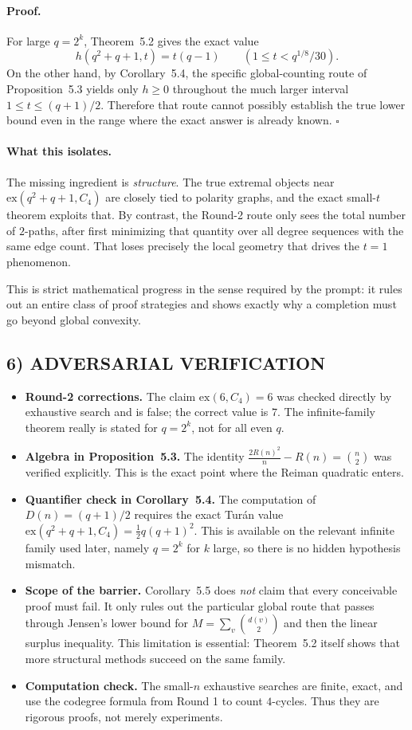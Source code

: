 \paragraph{Proof.}
For large $q=2^k$, Theorem~5.2 gives the exact value
\[
h(q^2+q+1,t)=t(q-1)
\qquad (1\le t<q^{1/8}/30).
\]
On the other hand, by Corollary~5.4, the specific global-counting route of Proposition~5.3 yields only $h\ge 0$ throughout the much larger interval $1\le t\le (q+1)/2$.
Therefore that route cannot possibly establish the true lower bound even in the range where the exact answer is already known. \hfill$\square$

\paragraph{What this isolates.}
The missing ingredient is \emph{structure}. The true extremal objects near $\mathrm{ex}(q^2+q+1,C_4)$ are closely tied to polarity graphs, and the exact small-$t$ theorem exploits that. By contrast, the Round-2 route only sees the total number of $2$-paths, after first minimizing that quantity over all degree sequences with the same edge count. That loses precisely the local geometry that drives the $t=1$ phenomenon.

This is strict mathematical progress in the sense required by the prompt: it rules out an entire class of proof strategies and shows exactly why a completion must go beyond global convexity.

\subsection*{6) ADVERSARIAL VERIFICATION}
\begin{itemize}
\item \textbf{Round-2 corrections.} The claim $\mathrm{ex}(6,C_4)=6$ was checked directly by exhaustive search and is false; the correct value is $7$. The infinite-family theorem really is stated for $q=2^k$, not for all even $q$.
\item \textbf{Algebra in Proposition~5.3.} The identity $\frac{2R(n)^2}{n}-R(n)=\binom n2$ was verified explicitly. This is the exact point where the Reiman quadratic enters.
\item \textbf{Quantifier check in Corollary~5.4.} The computation of $D(n)=(q+1)/2$ requires the exact Tur\'an value $\mathrm{ex}(q^2+q+1,C_4)=\tfrac12 q(q+1)^2$. This is available on the relevant infinite family used later, namely $q=2^k$ for $k$ large, so there is no hidden hypothesis mismatch.
\item \textbf{Scope of the barrier.} Corollary~5.5 does \emph{not} claim that every conceivable proof must fail. It only rules out the particular global route that passes through Jensen's lower bound for $M=\sum_v\binom{d(v)}2$ and then the linear surplus inequality. This limitation is essential: Theorem~5.2 itself shows that more structural methods succeed on the same family.
\item \textbf{Computation check.} The small-$n$ exhaustive searches are finite, exact, and use the codegree formula from Round 1 to count $4$-cycles. Thus they are rigorous proofs, not merely experiments.
\end{itemize}

